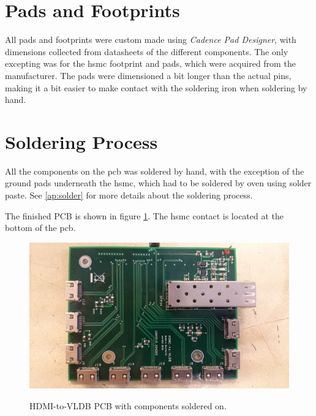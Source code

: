 \documentclass[main.tex]{subfiles}
\begin{document}

\section{Pads and Footprints}

All pads and footprints were custom made using \textit{Cadence Pad Designer}, with dimensions collected from datasheets of the different components. The only excepting was for the \gls{hsmc} footprint and pads, which were acquired from the manufacturer. The pads were dimensioned a bit longer than the actual pins, making it a bit easier to make contact with the soldering iron when soldering by hand.

\section{Soldering Process}

All the components on the \gls{pcb} was soldered by hand, with the exception of the ground pads underneath the \gls{hsmc}, which had to be soldered by oven using solder paste. See \ref{ap:solder} for more details about the soldering process.

The finished PCB is shown in figure \ref{fig:pcb_1}. The \gls{hsmc} contact is located at the bottom of the \gls{pcb}.

\begin{figure} [!t]%
\includegraphics[width=0.8\linewidth, trim={15cm 0 15cm 0},clip]{../img/pcb_1.JPG}  \\[0.1 cm]
\caption{HDMI-to-VLDB PCB with components soldered on.}
\label{fig:pcb_1}
\end{figure}
\end{document}
